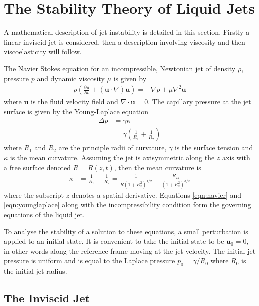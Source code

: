 \documentclass[11pt]{article}
\newcommand{\pd}[2]{\frac{\partial #1}{\partial #2}}
\begin{document}
\newpage

\section{The Stability Theory of Liquid Jets} \label{sec:stability}
A mathematical description of jet instability is detailed in this section. 
Firstly a linear inviscid jet is considered, then a description involving 
viscosity and then viscoelasticity will follow.

The Navier Stokes equation for an incompressible, Newtonian jet of density 
$\rho$, pressure $p$ and dynamic viscosity $\mu$ is given by
\begin{align}
\rho \left( \pd{\mathbf{u}}{t} + (\mathbf{u} \cdot \nabla) \mathbf{u} \right) 
= - \nabla p + \mu \nabla^2 \mathbf{u}
\label{eqn:navier}
\end{align}
where $\mathbf{u}$ is the fluid velocity field and $\nabla \cdot \mathbf{u} = 
0$. The capillary pressure at the jet surface is given by the Young-Laplace 
equation
\begin{align}
\Delta p &= \gamma \kappa \nonumber \\
&= \gamma \left(\frac{1}{R_1} + \frac{1}{R_2} \right)
\label{eqn:younglaplace}
\end{align}
where $R_1$ and $R_2$ are the principle radii of curvature, $\gamma$ is the 
surface tension and $\kappa$ is the mean curvature. Assuming the jet is 
axisymmetric along the $z$ axis with a free surface denoted  $R = R(z,t)$, then 
the mean curvature is
\begin{align}
\kappa &= \frac{1}{R_1} + \frac{1}{R_2} = \frac{1}{R(1+ R_z^2)^{1/2}} - 
\frac{R_{zz}}{(1 + R_z^2)^{3/2}}
\label{eqn:curvature}
\end{align}
where the subscript $z$ denotes a spatial derivative. Equations \ref{eqn:navier} 
and \ref{eqn:younglaplace} along with the incompressibility condition form the 
governing equations of the liquid jet.

To analyse the stability of a solution to these equations, a small perturbation 
is applied to an initial state. It is convenient to take the initial state to 
be $\mathbf{u}_0 = 0$, in other words along the reference frame moving at the 
jet velocity. The initial jet pressure is uniform and is equal to the Laplace 
pressure $p_0 = \gamma / R_0$ where $R_0$ is the initial jet radius.

\subsection{The Inviscid Jet}
\end{document}

